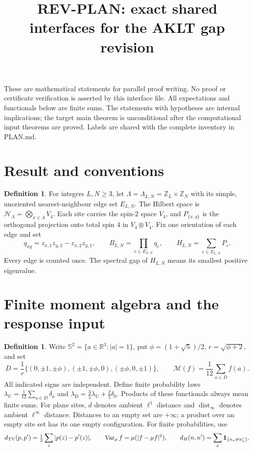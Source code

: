 \documentclass[11pt,reqno]{amsart}
\title{REV-PLAN: exact shared interfaces for the AKLT gap revision}
\date{}
\theoremstyle{definition}
\newtheorem{definition}[theorem]{Definition}
\theoremstyle{remark}
\begin{document}
\maketitle
\noindent These are mathematical statements for parallel proof writing.
No proof or certificate verification is asserted by this interface file.
All expectations and functionals below are finite sums.
The statements with hypotheses are internal implications; the target
main theorem is unconditional after the computational input theorems
are proved. Labels are shared with the complete inventory in PLAN.md.




\section{Result and conventions}

\begin{definition}\label{d:model}
For integers \(L,N\ge3\), let \(\Lambda=\Lambda_{L,N}=\mathbb Z_L\times\mathbb Z_N\)
with its simple, unoriented nearest-neighbour edge set \(E_{L,N}\).
The Hilbert space is \(\mathcal H_\Lambda=\bigotimes_{x\in\Lambda}V_4\).
Each site carries the spin-\(2\) space \(V_4\), and \(P_{\{x,y\}}\)
is the orthogonal projection onto total spin \(4\) in \(V_4\otimes V_4\).
Fix one orientation of each edge and set
\[
 q_{xy}=z_{x,1}z_{y,2}-z_{x,2}z_{y,1},\qquad
 B_{L,N}=\prod_{e\in E_{L,N}}q_e,\qquad
 H_{L,N}=\sum_{e\in E_{L,N}}P_e.
\]
Every edge is counted once. The spectral gap of \(H_{L,N}\) means its
smallest positive eigenvalue.
\end{definition}


\section{Finite moment algebra and the response input}

\begin{definition}\label{d:moment}
Write \(\mathbb S^2=\{a\in\mathbb R^3:|a|=1\}\), put
\(\phi=(1+\sqrt5)/2\), \(r=\sqrt{\phi+2}\), and set
\[
 D=\frac1r\{(0,\pm1,\pm\phi),(\pm1,\pm\phi,0),(\pm\phi,0,\pm1)\},
 \qquad
 \mathcal M(f)=\frac1{12}\sum_{a\in D}f(a).
\]
All indicated signs are independent. Define finite probability laws
\(\lambda_{\mathrm U}=\frac1{12}\sum_{a\in D}\delta_a\) and
\(\lambda_{\mathrm D}=\frac35\lambda_{\mathrm U}+\frac25\delta_0\).
Products of these functionals always mean finite sums.
For plane sites, \(d\) denotes ambient \(\ell^1\) distance and
\(\operatorname{dist}_\infty\) denotes ambient \(\ell^\infty\) distance.
Distances to an empty set are \(+\infty\); a product over an empty site
set has its one empty configuration. For finite probabilities, use
\[
 d_{\rm TV}(p,p')=\tfrac12\sum_z|p(z)-p'(z)|,\qquad
 \operatorname{Var}_\mu f=\mu(|f-\mu f|^2),\qquad
 d_H(n,n')=\sum_x\mathbf1_{\{n_x\ne n'_x\}} .
\]
\end{definition}
\end{document}
